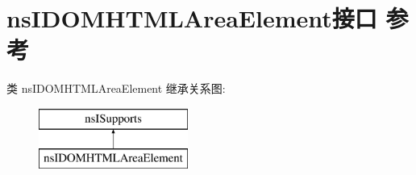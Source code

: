 \hypertarget{interfacens_i_d_o_m_h_t_m_l_area_element}{}\section{ns\+I\+D\+O\+M\+H\+T\+M\+L\+Area\+Element接口 参考}
\label{interfacens_i_d_o_m_h_t_m_l_area_element}
类 ns\+I\+D\+O\+M\+H\+T\+M\+L\+Area\+Element 继承关系图\+:\begin{figure}[H]
\begin{center}
\leavevmode
\includegraphics[height=2.000000cm]{interfacens_i_d_o_m_h_t_m_l_area_element}
\end{center}
\end{figure}
